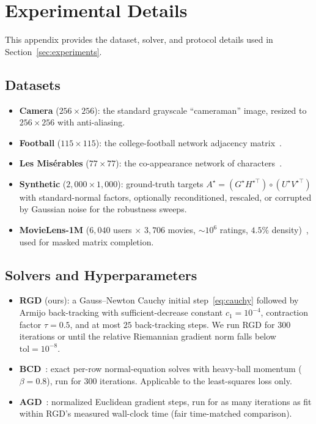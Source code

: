 \documentclass[letterpaper, 10 pt, conference]{ieeeconf}
\newcommand{\Had}{\circ}
\theoremstyle{plain}
\theoremstyle{definition}
\theoremstyle{remark}
\begin{document}
\section{Experimental Details}
\label{app:expdetails}
This appendix provides the dataset, solver, and protocol details used in Section~\ref{sec:experiments}.

\subsection{Datasets}
\begin{itemize}[nosep]
  \item \textbf{Camera} ($256{\times}256$): the standard grayscale ``cameraman'' image, resized to $256{\times}256$ with anti-aliasing.
  \item \textbf{Football} ($115{\times}115$): the college-football network adjacency matrix~\cite{girvan2002community}.
  \item \textbf{Les Mis\'{e}rables} ($77{\times}77$): the co-appearance network of characters~\cite{knuth1993stanford}.
  \item \textbf{Synthetic} ($2{,}000{\times}1{,}000$): ground-truth targets $A^\star = (G^\star H^{\star\top})\Had(U^\star V^{\star\top})$ with standard-normal factors, optionally reconditioned, rescaled, or corrupted by Gaussian noise for the robustness sweeps.
  \item \textbf{MovieLens-1M} ($6{,}040$ users $\times$ $3{,}706$ movies, $\sim\!10^6$ ratings, $4.5\%$ density)~\cite{harper2015movielens}, used for masked matrix completion.
\end{itemize}

\subsection{Solvers and Hyperparameters}
\begin{itemize}[nosep]
  \item \textbf{RGD} (ours): a Gauss--Newton Cauchy initial step~\eqref{eq:cauchy} followed by Armijo back-tracking with sufficient-decrease constant $c_1 = 10^{-4}$, contraction factor $\tau = 0.5$, and at most $25$ back-tracking steps. We run RGD for $300$ iterations or until the relative Riemannian gradient norm falls below $\mathrm{tol} = 10^{-8}$.
  \item \textbf{BCD}~\cite{wertz2024bcd}: exact per-row normal-equation solves with heavy-ball momentum ($\beta = 0.8$), run for $300$ iterations. Applicable to the least-squares loss only.
  \item \textbf{AGD}~\cite{ciaperoni2024hadamard}: normalized Euclidean gradient steps, run for as many iterations as fit within RGD's measured wall-clock time (fair time-matched comparison).
\end{itemize}
\end{document}
